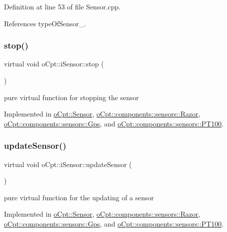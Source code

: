 Definition at line 53 of file Sensor.\+cpp.



References type\+Of\+Sensor\+\_\+.

\hypertarget{classo_cpt_1_1i_sensor_aa85c22a8c8f7c2445379e1f82835f8dc}{}\label{classo_cpt_1_1i_sensor_aa85c22a8c8f7c2445379e1f82835f8dc} 
\subsubsection{\texorpdfstring{stop()}{stop()}}
{\footnotesize\ttfamily virtual void o\+Cpt\+::i\+Sensor\+::stop (\begin{DoxyParamCaption}{ }\end{DoxyParamCaption})\hspace{0.3cm}{\ttfamily [pure virtual]}}

pure virtual function for stopping the sensor 

Implemented in \hyperlink{classo_cpt_1_1_sensor_a44ad78c2c091ca9cf72295293f8c5b74}{o\+Cpt\+::\+Sensor}, \hyperlink{classo_cpt_1_1components_1_1sensors_1_1_razor_a807441c137892ee3c1b612c284893fa1}{o\+Cpt\+::components\+::sensors\+::\+Razor}, \hyperlink{classo_cpt_1_1components_1_1sensors_1_1_gps_a9206c32fa91311740ae920c01eed6094}{o\+Cpt\+::components\+::sensors\+::\+Gps}, and \hyperlink{classo_cpt_1_1components_1_1sensors_1_1_p_t100_a6d80e18a58cf4e1b9b6ce82b441209e2}{o\+Cpt\+::components\+::sensors\+::\+P\+T100}.

\hypertarget{classo_cpt_1_1i_sensor_aa55bc04979e4852989af2bd4f64e70bc}{}\label{classo_cpt_1_1i_sensor_aa55bc04979e4852989af2bd4f64e70bc} 
\subsubsection{\texorpdfstring{update\+Sensor()}{updateSensor()}}
{\footnotesize\ttfamily virtual void o\+Cpt\+::i\+Sensor\+::update\+Sensor (\begin{DoxyParamCaption}{ }\end{DoxyParamCaption})\hspace{0.3cm}{\ttfamily [pure virtual]}}

pure virtual function for the updating of a sensor 

Implemented in \hyperlink{classo_cpt_1_1_sensor_ab4b0dedb06f11bcf2368852035beb2b2}{o\+Cpt\+::\+Sensor}, \hyperlink{classo_cpt_1_1components_1_1sensors_1_1_razor_ac8ee1582eb5c478c73e5e050858d2d7d}{o\+Cpt\+::components\+::sensors\+::\+Razor}, \hyperlink{classo_cpt_1_1components_1_1sensors_1_1_gps_a95976c5d8bba650d2732d4eb43979283}{o\+Cpt\+::components\+::sensors\+::\+Gps}, and \hyperlink{classo_cpt_1_1components_1_1sensors_1_1_p_t100_a66619675288a5344a55242d9bf097aee}{o\+Cpt\+::components\+::sensors\+::\+P\+T100}.



